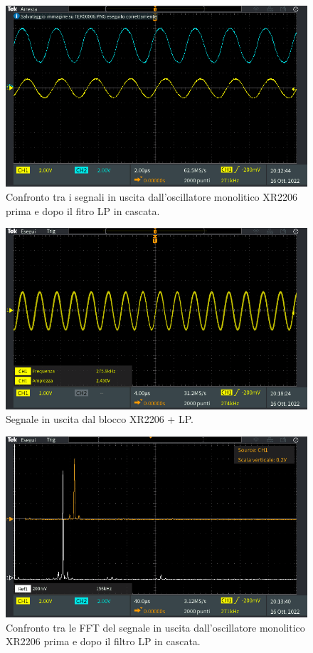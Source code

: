 \documentclass[titlepage]{report}
\begin{document}
	\begin{figure}[H]
		\centering
		\includegraphics[scale=0.5]{Immagini/sin_xr+lp.PNG}
		\caption{Confronto tra i segnali in uscita dall'oscillatore monolitico XR2206 prima e dopo il fitro LP in cascata.}
		\label{fig:SINxr+LP}
	\end{figure}


	\begin{figure}[H]
		\centering
		\includegraphics[scale=0.5]{Immagini/sin_xr.PNG}
		\caption{Segnale in uscita dal blocco XR2206 + LP.}
		\label{fig:SINx}
	\end{figure}

	\begin{figure}[H]
		\centering
		\includegraphics[scale=0.5]{Immagini/fft_xr+lp.PNG}
		\caption{Confronto tra le FFT del segnale in uscita dall'oscillatore monolitico XR2206 prima e dopo il filtro LP in cascata.}
		\label{fig:FFTxr+LP}
	\end{figure}
\end{document}
